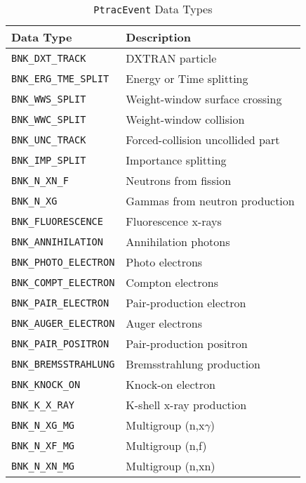 \documentclass[11pt]{article}
\begin{document}
\begin{table}[]
  \begin{center}
  \caption{\texttt{PtracEvent} Data Types}
  \label{tab:ptracevent_data_types}
    \begin{tabular}{lp{4.75in}}
      \toprule
        Data Type & Description \\
      \midrule
        \texttt{BNK\_DXT\_TRACK}       & DXTRAN particle \\
        \texttt{BNK\_ERG\_TME\_SPLIT}  & Energy or Time splitting \\
        \texttt{BNK\_WWS\_SPLIT}       & Weight-window surface crossing \\
        \texttt{BNK\_WWC\_SPLIT}       & Weight-window collision \\
        \texttt{BNK\_UNC\_TRACK}       & Forced-collision uncollided part \\
        \texttt{BNK\_IMP\_SPLIT}       & Importance splitting \\
        \texttt{BNK\_N\_XN\_F}         & Neutrons from fission \\
        \texttt{BNK\_N\_XG}            & Gammas from neutron production \\
        \texttt{BNK\_FLUORESCENCE}     & Fluorescence x-rays \\
        \texttt{BNK\_ANNIHILATION}     & Annihilation photons \\
        \texttt{BNK\_PHOTO\_ELECTRON}  & Photo electrons \\
        \texttt{BNK\_COMPT\_ELECTRON}  & Compton electrons \\
        \texttt{BNK\_PAIR\_ELECTRON}   & Pair-production electron \\
        \texttt{BNK\_AUGER\_ELECTRON}  & Auger electrons \\
        \texttt{BNK\_PAIR\_POSITRON}   & Pair-production positron \\
        \texttt{BNK\_BREMSSTRAHLUNG}   & Bremsstrahlung production \\
        \texttt{BNK\_KNOCK\_ON}        & Knock-on electron \\
        \texttt{BNK\_K\_X\_RAY}        & K-shell x-ray production \\
        \texttt{BNK\_N\_XG\_MG}        & Multigroup (n,x$\gamma$) \\
        \texttt{BNK\_N\_XF\_MG}        & Multigroup (n,f) \\
        \texttt{BNK\_N\_XN\_MG}        & Multigroup (n,xn) \\

\end{tabular}
\end{center}
\end{table}
\end{document}
